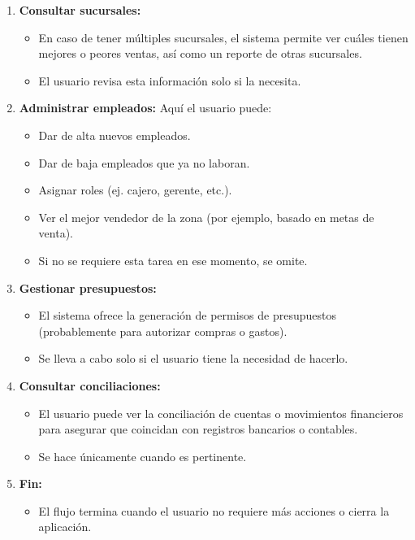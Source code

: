 \documentclass[protocolo.tex]{subfiles}
\begin{document}
\begin{enumerate}
\begin{itemize}
    \end{itemize}
    \item \textbf{Consultar sucursales:} 
    \begin{itemize}
        \item En caso de tener múltiples sucursales, el sistema permite ver cuáles tienen mejores o peores ventas, así como un reporte de otras sucursales.
        \item El usuario revisa esta información solo si la necesita.
        
        
    \end{itemize}
    \item \textbf{Administrar empleados:}
    Aquí el usuario puede:
    \begin{itemize}
        \item Dar de alta nuevos empleados.
        \item Dar de baja empleados que ya no laboran.
        \item Asignar roles (ej. cajero, gerente, etc.).
        \item Ver el mejor vendedor de la zona (por ejemplo, basado en metas de venta).
        \item Si no se requiere esta tarea en ese momento, se omite.

    \end{itemize}
    \item \textbf{Gestionar presupuestos:} 
   \begin{itemize}
        \item El sistema ofrece la generación de permisos de presupuestos (probablemente para autorizar compras o gastos).
        \item Se lleva a cabo solo si el usuario tiene la necesidad de hacerlo.

    \end{itemize}
    \item \textbf{Consultar conciliaciones:}
    \begin{itemize}
        \item El usuario puede ver la conciliación de cuentas o movimientos financieros para asegurar que coincidan con registros bancarios o contables.
        \item Se hace únicamente cuando es pertinente.

    \end{itemize}
    \item \textbf{Fin:}  
    \begin{itemize}
        \item El flujo termina cuando el usuario no requiere más acciones o cierra la aplicación.
    \end{itemize}
\end{enumerate}
\end{document}
